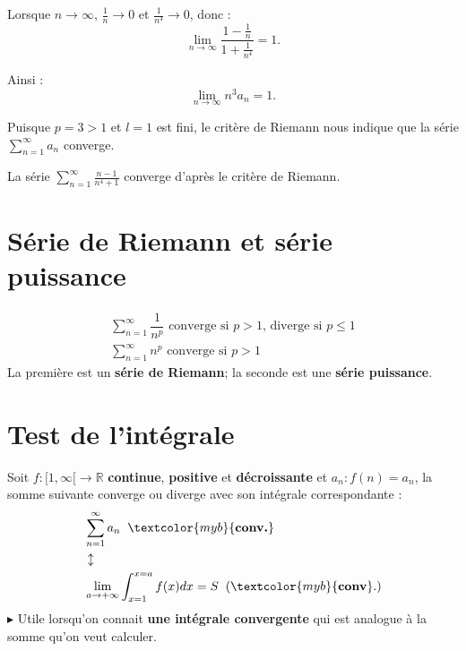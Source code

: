 \documentclass{report}
\begin{document}
\begin{multicols*}{3}
Lorsque $n \to \infty$, $\frac{1}{n} \to 0$ et $\frac{1}{n^4} \to 0$, donc :
\[
\lim_{n \to \infty} \frac{1 - \frac{1}{n}}{1 + \frac{1}{n^4}} = 1.
\]

Ainsi :
\[
\lim_{n \to \infty} n^3 a_n = 1.
\]


Puisque $p = 3 > 1$ et $l = 1$ est fini, le critère de Riemann nous indique que
la série $\sum_{n=1}^\infty a_n$ converge.


La série $\displaystyle \sum_{n=1}^\infty \frac{n - 1}{n^4 + 1}$ converge
d’après le critère de Riemann.

    \section{Série de Riemann et série puissance} 
    \vspace{-1em}
    \begin{align*}
        \sum_{n=1}^{\infty }\dfrac{1}{n^p} 
        \text{ converge si } p > 1 \text{, diverge si } p \leq 1
        \\
        \sum_{n=1}^{\infty }n^p \text{ converge  si }
         p > 1 
    \end{align*}
    La première est un \textbf{série de Riemann}; la seconde 
    est une \textbf{série puissance}. 

    \section{Test de l'intégrale}
    Soit $f : [1, \infty [ \rightarrow  \mathbb{R}$ 
    \textbf{continue}, \textbf{positive} et \textbf{décroissante} 
    et $a_n : f(n) = a_n$, la somme suivante converge ou diverge avec 
    son intégrale correspondante :
    \begin{align*}
        &\sum_{n=1}^{\infty }a_n \;\; \textcolor{myb}{\textbf{conv.}} 
        \\
        & \updownarrow 
        \\
        &\lim\limits_{a \to +\infty }\int_{x=1}^{x = a}f(x)dx = S \;\; 
        (\textcolor{myb}{\textbf{conv}}.)    
    \end{align*}
    $\blacktriangleright$ Utile lorsqu'on connait \textbf{une intégrale convergente} qui est 
    analogue à la somme qu'on veut calculer. 





\end{multicols*}
\end{document}
